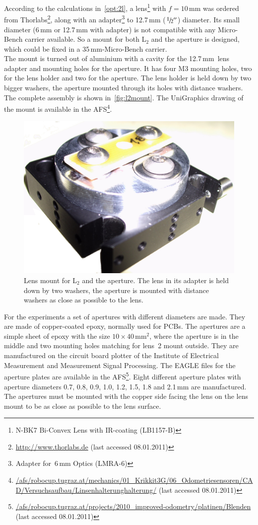 \documentclass[12pt,a4paper]{article}
\newcommand{\EMT}{Institute of Electrical Measurement and Measurement Signal Processing}
\begin{document}
According to the calculations in~\autoref{opt:2l}, a lens\footnote{N-BK7 Bi-Convex Lens with IR-coating (LB1157-B)} with $f=10$\,mm was ordered from Thorlabs\footnote{\url{http://www.thorlabs.de} (last accessed 08.01.2011) }, along with an adapter\footnote{Adapter for \diameter\,6\,mm Optics (LMRA-6)} to 12.7\,mm ($\sfrac{1}{2}''$) diameter.
Its small diameter (6\,mm or 12.7\,mm with adapter) is not compatible with any Micro-Bench carrier available.
So a mount for both L$_2$ and the aperture is designed, which could be fixed in a 35\,mm-Micro-Bench carrier.\\
The mount is turned out of aluminium with a cavity for the 12.7\,mm~lens adapter and mounting holes for the aperture.
It has four M3 mounting holes, two for the lens holder and two for the aperture.
The lens holder is held down by two bigger washers, the aperture mounted through its holes with distance washers.
The complete assembly is shown in~\autoref{fig:l2mount}.
The UniGraphics drawing of the mount is available in the AFS\footnote{\url{/afs/robocup.tugraz.at/mechanics/01_Krikkit3G/06_Odometriesensoren/CAD/Versuchsaufbau/Linsenhalterunghalterung/} (last accessed 08.01.2011) }.

\begin{figure}[htbp]
\begin{center}
\includegraphics[width=0.4\columnwidth]{figures/lens-mount.jpg}
\caption{\label{fig:l2mount}
Lens mount for L$_2$ and the aperture.
The lens in its adapter is held down by two washers,
the aperture is mounted with distance washers as close as possible to the lens.
}
\end{center}
\end{figure}

For the experiments a set of apertures with different diameters are made.
They are made of copper-coated epoxy, normally used for PCBs.
The apertures are a simple sheet of epoxy with the size $10\times40$\,mm$^2$, where the aperture is in the middle and two mounting holes matching for lens~2 mount outside.
They are manufactured on the circuit board plotter of the \EMT. 
The EAGLE files for the aperture plates are available in the AFS\footnote{\url{/afs/robocup.tugraz.at/projects/2010_improved-odometry/platinen/Blenden} (last accessed 08.01.2011)}.
Eight different aperture plates with aperture diameters 0.7, 0.8, 0.9, 1.0, 1.2, 1.5, 1.8 and 2.1\,mm are manufactured.
The apertures must be mounted with the copper side facing the lens on the lens mount to be as close as possible to the lens surface.
\end{document}
